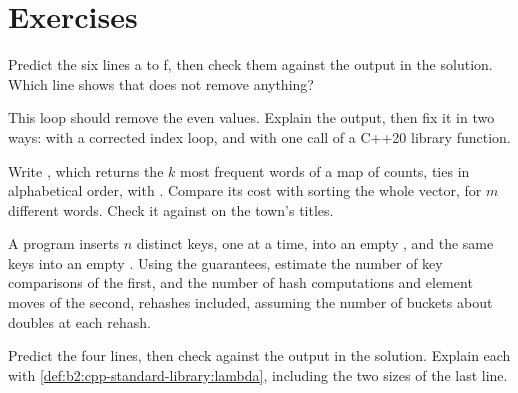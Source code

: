 \section{Exercises}\label{sec:b2:cpp-standard-library:exercises}

\begin{exercise}[$\star$]\label{exo:b2:cpp-standard-library:1}
Predict the six lines a to f, then check them against the output in the solution. Which line shows that
 does not remove anything?
\end{exercise}

\begin{exercise}[$\star$]\label{exo:b2:cpp-standard-library:2}
This loop should remove the even values. Explain the output, then fix it in two ways: with a corrected index loop,
and with one call of a C++20 library function.
\end{exercise}

\begin{exercise}[$\star$]\label{exo:b2:cpp-standard-library:3}
Write , which returns the $k$ most frequent words of a map of counts, ties in alphabetical
order, with . Compare its cost with sorting the whole vector, for $m$ different words.
Check it against  on the town's titles.
\end{exercise}

\begin{exercise}[$\star$]\label{exo:b2:cpp-standard-library:4}
A program inserts $n$ distinct keys, one at a time, into an empty , and the same keys into an empty
. Using the guarantees, estimate the number of key comparisons of the first, and the number of
hash computations and element moves of the second, rehashes included, assuming the number of buckets about doubles
at each rehash.
\end{exercise}

\begin{exercise}[$\star\star$]\label{exo:b2:cpp-standard-library:5}
Predict the four lines, then check against the output in the solution. Explain each with
\cref{def:b2:cpp-standard-library:lambda}, including the two sizes of the last line.
\end{exercise}

